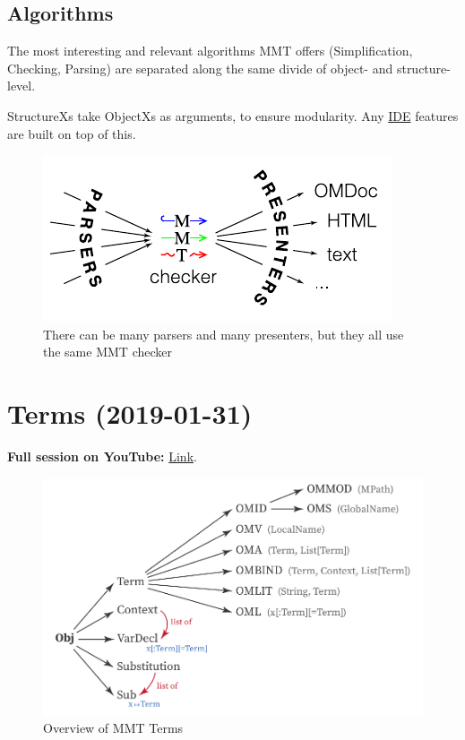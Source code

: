 \documentclass[11pt,a4paper]{article}
\newcommand{\MMT}{\textsf{MMT}\xspace}
\begin{document}
\subsection{Algorithms}

The most interesting and relevant algorithms \MMT offers (Simplification, Checking, Parsing) are separated along the same divide of object- and structure-level.

StructureXs take ObjectXs as arguments, to ensure modularity. Any \href{https://uniformal.github.io/doc/setup/#2-install-an-ide-jedit-or-intellij-idea-if-you-havent-already}{IDE} features are built on top of this.

\begin{figure}[ht]
\centering
\includegraphics[scale=1.5]{parsers-mmt-presenters.pdf}
\caption{There can be many parsers and many presenters, but they all use the same \MMT checker}
\label{fig:mmtbottleneck}
\end{figure}

\section{Terms (2019-01-31)}
\label{sec:terms}

\textbf{Full session on YouTube:} \href{https://www.youtube.com/watch?v=vtePl2pGhfc}{Link}.
\bigskip

\begin{figure}[ht]
\includegraphics[scale=1]{mmt-terms.pdf}
\caption{Overview of \MMT Terms}
\label{fig:mmtterms}
\end{figure}
\end{document}
